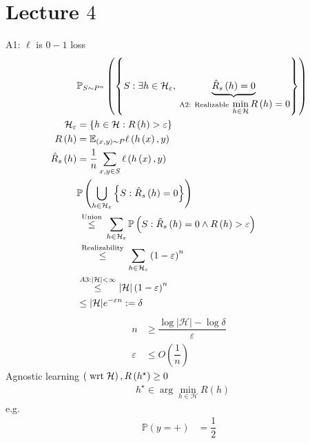 \documentclass{article}
\begin{document}
\section{Lecture $4$} 
A1: $\ell$ is $0-1$ loss
\begin{align*}
&\mathbb{P}_{S \sim  P^{n}}\left(\left\{S: \exists h \in \mathcal{H}_{\varepsilon}, \underbrace{\hat{R}_{s}\left(h\right) = 0}_{\text{\;A2: Realizable\;} \displaystyle\min_{h \in \mathcal{H}} R\left(h\right) = 0}\right\}\right)
\\ \mathcal{H}_{\varepsilon} &= \left\{h \in \mathcal{H} : R\left(h\right) > \varepsilon\right\}
\\ R\left(h\right)  &= \mathbb{E}_{\left(x, y\right) \sim  P} \ell\left(h\left(x\right), y\right)
\\ \hat{R}_{s}\left(h\right) &= \dfrac{1}{n} \displaystyle\sum_{x, y \in S} \ell\left(h\left(x\right), y\right)
\\ &  \mathbb{P}\left(\displaystyle\bigcup _{h \in \mathcal{H}_{\varepsilon}} \left\{S: \hat{R}_{s}\left(h\right) = 0\right\}\right)
\\ &\stackrel{\text{\;Union\;}}{\leq} \displaystyle\sum_{h \in \mathcal{H}_{\varepsilon}} \mathbb{P}\left(S: \hat{R}_{s}\left(h\right) = 0 \wedge R\left(h\right) > \varepsilon\right)
\\ &\stackrel{\text{\;Realizability\;}}{\leq} \displaystyle\sum_{h \in \mathcal{H}_{\varepsilon}} \left(1 - \varepsilon\right)^{n}
\\ &\stackrel{A3: | \mathcal{H} | < \infty}{\leq} | \mathcal{H} | \left(1 - \varepsilon\right)^{n}
\\ &\leq  | \mathcal{H} | e^{-\varepsilon n} := \delta
\end{align*}
\begin{align*}
n  &\geq  \dfrac{\log | \mathcal{H} | - \log \delta}{\varepsilon}
\\ \varepsilon &\leq  O\left(\dfrac{1}{n}\right) 
\end{align*}
Agnostic learning $\left(\text{\;wrt\;} \mathcal{H}\right), R\left(h^\star \right)  \geq  0$
\begin{align*}
&h^\star  \in \arg\displaystyle\min_{h \in \mathcal{H}} R\left(h\right) 
\end{align*}
e.g.
\begin{align*}
\mathbb{P}\left(y = +\right) &= \dfrac{1}{2}
\end{align*}
\begin{figure}[H] \centering {} 
\end{figure}
\end{document}
